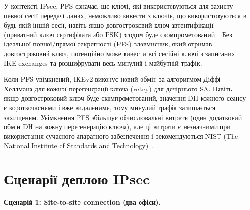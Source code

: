 У контексті IPsec, PFS означає, що ключі, які використовуються для захисту певної сесії передачі даних, неможливо 
вивести з ключів, що використовуються в будь-якій іншій сесії, навіть якщо довгостроковий ключ автентифікації 
(приватний ключ сертифіката або PSK) згодом буде скомпрометований~\cite{rfc7296}. Без ідеальної повної/прямої 
секретності (PFS) зловмисник, який отримав довгостроковий ключ, потенційно може вивести всі сесійні ключі з 
записаних IKE exchanges та розшифрувати весь минулий і майбутній трафік.

Коли PFS увімкнений, IKEv2 виконує новий обмін за алгоритмом Діффі–Хеллмана для кожної перегенерації ключа (rekey) 
для дочірнього SA. Навіть якщо довгостроковий ключ буде скомпрометований, значення DH кожного сеансу є короткочасними 
і вже видаленими, тому минулий трафік залишається захищеним. Увімкнення PFS збільшує обчислювальні витрати (один 
додатковий обмін DH на кожну перегенерацію ключа), але ці витрати є незначними при використання сучасного апаратного 
забезпечення і рекомендуються NIST (The National Institute of Standards and Technology)~\cite{nist_sp800_77r1}.

\section{Сценарії деплою IPsec}
\label{sec:task2}

\textbf{Сценарій 1: Site-to-site connection (два офіси).}

